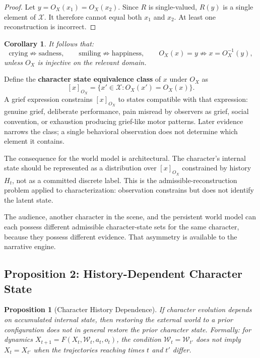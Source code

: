 \documentclass[11pt,a4paper]{article}
\theoremstyle{plain}
\newtheorem{proposition}[theorem]{Proposition}
\newtheorem{corollary}[theorem]{Corollary}
\theoremstyle{definition}
\theoremstyle{remark}
\begin{document}
\begin{proof}
Let $y = O_X(x_1) = O_X(x_2)$. Since $R$ is single-valued, $R(y)$ is a single element of $\mathcal{X}$. It therefore cannot equal both $x_1$ and $x_2$. At least one reconstruction is incorrect.
\end{proof}

\begin{corollary}
It follows that:
\[
\text{crying} \not\Rightarrow \text{sadness}, \qquad \text{smiling} \not\Rightarrow \text{happiness}, \qquad O_X(x) = y \not\Rightarrow x = O_X^{-1}(y),
\]
unless $O_X$ is injective on the relevant domain.
\end{corollary}

Define the \textbf{character state equivalence class} of $x$ under $O_X$ as
\[
[x]_{O_X} = \{x' \in \mathcal{X} : O_X(x') = O_X(x)\}.
\]
A grief expression constrains $[x]_{O_X}$ to states compatible with that expression: genuine grief, deliberate performance, pain misread by observers as grief, social convention, or exhaustion producing grief-like motor patterns. Later evidence narrows the class; a single behavioral observation does not determine which element it contains.

The consequence for the world model is architectural. The character's internal state should be represented as a distribution over $[x]_{O_X}$ constrained by history $H_t$, not as a committed discrete label. This is the admissible-reconstruction problem applied to characterization: observation constrains but does not identify the latent state.

The audience, another character in the scene, and the persistent world model can each possess different admissible character-state sets for the same character, because they possess different evidence. That asymmetry is available to the narrative engine.

\subsection{Proposition 2: History-Dependent Character State}

\begin{proposition}[Character History Dependence]
\label{prop:history}
If character evolution depends on accumulated internal state, then restoring the external world to a prior configuration does not in general restore the prior character state. Formally: for dynamics $X_{t+1} = F(X_t, \mathcal{W}_t, a_t, o_t)$, the condition $\mathcal{W}_t = \mathcal{W}_{t'}$ does not imply $X_t = X_{t'}$ when the trajectories reaching times $t$ and $t'$ differ.
\end{proposition}
\end{document}

